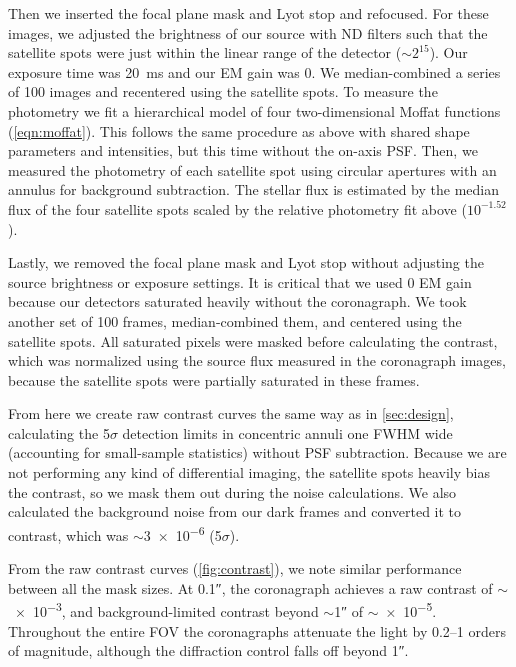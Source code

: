 \documentclass[]{spie}  %
\begin{document}
Then we inserted the focal plane mask and Lyot stop and refocused. For these images, we adjusted the brightness of our source with ND filters such that the satellite spots were just within the linear range of the detector ($\sim2^{15}$). Our exposure time was \qty{20}{\milli\second} and our EM gain was 0. We median-combined a series of 100 images and recentered using the satellite spots. To measure the photometry we fit a hierarchical model of four two-dimensional Moffat functions (\autoref{eqn:moffat}). This follows the same procedure as above with shared shape parameters and intensities, but this time without the on-axis PSF. Then, we measured the photometry of each satellite spot using circular apertures with an annulus for background subtraction. The stellar flux is estimated by the median flux of the four satellite spots scaled by the relative photometry fit above ($10^{-1.52}$).

Lastly, we removed the focal plane mask and Lyot stop without adjusting the source brightness or exposure settings. It is critical that we used 0 EM gain because our detectors saturated heavily without the coronagraph. We took another set of 100 frames, median-combined them, and centered using the satellite spots. All saturated pixels were masked before calculating the contrast, which was normalized using the source flux measured in the coronagraph images, because the satellite spots were partially saturated in these frames.

From here we create raw contrast curves the same way as in \autoref{sec:design}, calculating the 5$\sigma$ detection limits in concentric annuli one FWHM wide (accounting for small-sample statistics\cite{mawet2014}) without PSF subtraction. Because we are not performing any kind of differential imaging, the satellite spots heavily bias the contrast, so we mask them out during the noise calculations. We also calculated the background noise from our dark frames and converted it to contrast, which was $\sim$\num{3e-6} (5$\sigma$).

From the raw contrast curves (\autoref{fig:contrast}), we note similar performance between all the mask sizes. At \ang{;;0.1}, the coronagraph achieves a raw contrast of $\sim$ \num{e-3}, and background-limited contrast beyond $\sim$\ang{;;1} of $\sim$\num{e-5}. Throughout the entire FOV the coronagraphs attenuate the light by \numrange{0.2}{1} orders of magnitude, although the diffraction control falls off beyond \ang{;;1}.
\end{document}
